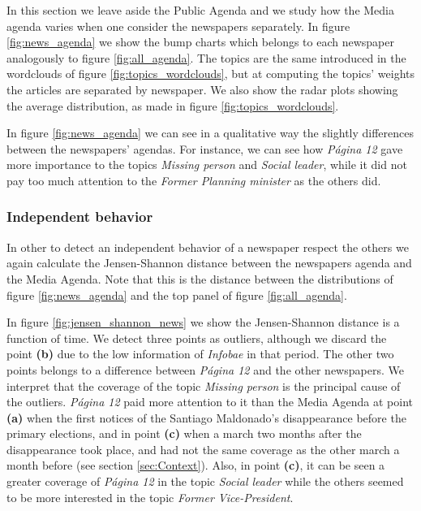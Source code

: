 \documentclass{bmcart}
\begin{document}
\par In this section we leave aside the Public Agenda and we study how the Media agenda varies when one consider the newspapers separately.
In figure \ref{fig:news_agenda} we show the bump charts which belongs to each newspaper analogously to figure \ref{fig:all_agenda}.
The topics are the same introduced in the wordclouds of figure \ref{fig:topics_wordclouds}, but at computing the topics' weights the articles are separated by newspaper.
We also show the radar plots showing the average distribution, as made in figure \ref{fig:topics_wordclouds}.
\par In figure \ref{fig:news_agenda} we can see in a qualitative way the slightly differences between the newspapers' agendas.
For instance, we can see how \emph{Página 12} gave more importance to the topics \emph{Missing person} and \emph{Social leader}, while it did not pay too much attention to the \emph{Former Planning minister} as the others did.

\subsubsection*{Independent behavior}

\par In other to detect an independent behavior of a newspaper respect the others we again calculate the Jensen-Shannon distance between the newspapers agenda and the Media Agenda.
Note that this is the distance between the distributions of figure \ref{fig:news_agenda} and the top panel of figure \ref{fig:all_agenda}.
\par In figure \ref{fig:jensen_shannon_news} we show the Jensen-Shannon distance is a function of time.
We detect three points as outliers, although we discard the point \textbf{(b)} due to the low information of \emph{Infobae} in that period.
The other two points belongs to a difference between \emph{Página 12} and the other newspapers.
We interpret that the coverage of the topic \emph{Missing person} is the principal cause of the outliers.
\emph{Página 12} paid more attention to it than the Media Agenda at point \textbf{(a)} when the first notices of the Santiago Maldonado's disappearance before the primary elections, and in point \textbf{(c)} when a march two months after the disappearance took place, and had not the same coverage as the other march a month before (see section \ref{sec:Context}). Also, in point \textbf{(c)}, it can be seen a greater coverage of \emph{Página 12} in the topic \emph{Social leader} while the others seemed to be more interested in the topic \emph{Former Vice-President}.
\end{document}
